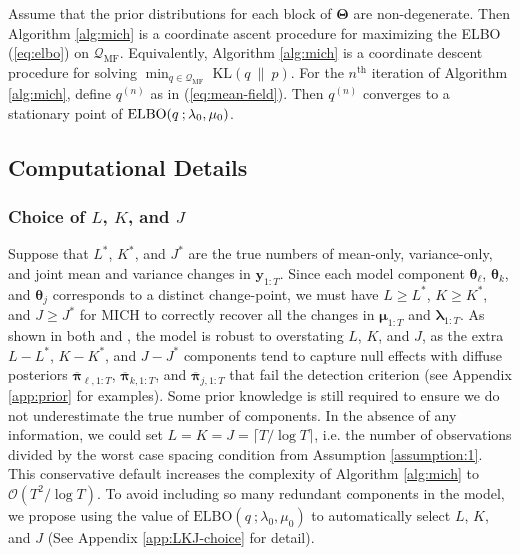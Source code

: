 \begin{proposition}
\label{prop:coord-ascent}
Assume that the prior distributions for each block of $\boldsymbol{\Theta}$ are non-degenerate. Then Algorithm \ref{alg:mich} is a coordinate ascent procedure for maximizing the ELBO (\ref{eq:elbo}) on $ \mathcal{Q}_{\text{MF}}$. Equivalently, Algorithm \ref{alg:mich} is a coordinate descent procedure for solving $\min_{q \in  \mathcal{Q}_{\text{MF}}}  \; \text{KL}( q \:\lVert\: p)$. 
For the $n^{\text{th}}$ iteration of Algorithm \ref{alg:mich}, define $q^{(n)}$ as in (\ref{eq:mean-field}). Then $q^{(n)}$ converges to a stationary point of $\text{\normalfont ELBO}(q\:;\lambda_0, \mu_0)$.
\end{proposition}
\vspace{-10pt}


\subsection{Computational Details}

\subsubsection{Choice of \texorpdfstring{$L$}{L}, \texorpdfstring{$K$}{K}, and \texorpdfstring{$J$}{J}}
\label{sec:LKJ}

Suppose that $L^*$, $K^*$, and $J^*$ are the true numbers of mean-only, variance-only, and joint mean and variance changes in $\mathbf{y}_{1:T}$. Since each model component $\boldsymbol{\theta}_\ell$, $\boldsymbol{\theta}_k$, and $\boldsymbol{\theta}_j$ corresponds to a distinct change-point, we must have $L \geq L^*$, $K \geq K^*$, and $J \geq J^*$ for MICH to correctly recover all the changes in $\boldsymbol{\mu}_{1:T}$ and $\boldsymbol{\lambda}_{1:T}$. As shown in both \cite{Wang21} and \cite{Cappello22}, the model is robust to overstating $L$, $K$, and $J$, as the extra $L - L^*$, $K- K^*$, and $J - J^*$ components tend to capture null effects with diffuse posteriors $\overline{\boldsymbol{\pi}}_{\ell,1:T}$, $\overline{\boldsymbol{\pi}}_{k,1:T}$, and $\overline{\boldsymbol{\pi}}_{j,1:T}$ that fail the detection criterion (see Appendix \ref{app:prior} for examples). Some prior knowledge is still required to ensure we do not underestimate the true number of components. In the absence of any information, we could set $L=K=J=\lceil T /\log T \rceil$, i.e. the number of observations divided by the worst case spacing condition from Assumption \ref{assumption:1}. This conservative default increases the complexity of Algorithm \ref{alg:mich} to $\mathcal{O}(T^2/\log T)$. To avoid including so many redundant components in the model, we propose using the value of $\text{ELBO}(q\:;\lambda_0, \mu_0)$ to automatically select $L$, $K$, and $J$ (See Appendix \ref{app:LKJ-choice} for detail). 

